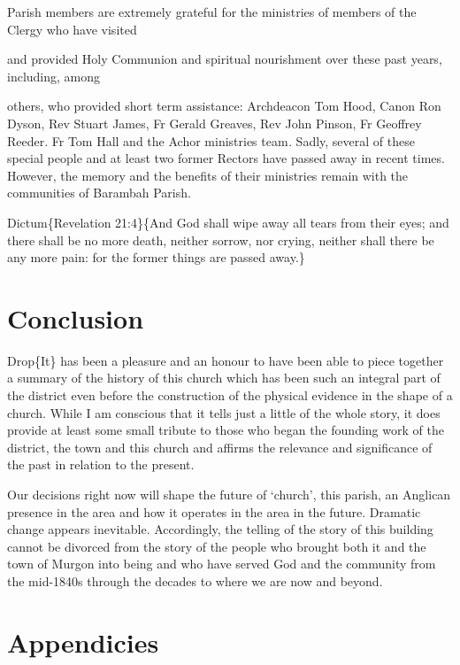 Parish members are extremely grateful for the ministries of members of the Clergy who have visited

and provided Holy Communion and spiritual nourishment over these past years, including, among

others, who provided short term assistance: Archdeacon Tom Hood, Canon Ron Dyson, Rev Stuart James, Fr Gerald Greaves, Rev John Pinson, Fr Geoffrey Reeder. Fr Tom Hall and the Achor ministries team\emph{.} Sadly, several of these special people and at least two former Rectors have passed away in recent times. However, the memory and the benefits of their ministries remain with the communities of Barambah Parish.

Dictum\{Revelation 21:4\}\{And God shall wipe away all tears from their eyes; and there shall be no more death, neither sorrow, nor crying, neither shall there be any more pain: for the former things are passed away.\}

\hypertarget{conclusion}{%
\chapter{Conclusion}\label{conclusion}}

Drop\{It\} has been a pleasure and an honour to have been able to piece together a summary of the history of this church which has been such an integral part of the district even before the construction of the physical evidence in the shape of a church. While I am conscious that it tells just a little of the whole story, it does provide at least some small tribute to those who began the founding work of the district, the town and this church and affirms the relevance and significance of the past in relation to the present.

Our decisions right now will shape the future of `church', this parish, an Anglican presence in the area and how it operates in the area in the future. Dramatic change appears inevitable. Accordingly, the telling of the story of this building cannot be divorced from the story of the people who brought both it and the town of Murgon into being and who have served God and the community from the mid-1840s through the decades to where we are now and beyond.

\hypertarget{appendicies}{%
\chapter{Appendicies}\label{appendicies}}

